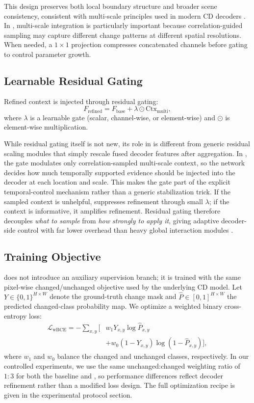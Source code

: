 This design preserves both local boundary structure and broader scene consistency, consistent with multi-scale principles used in modern CD decoders \cite{yan2024,shanshan2024,binhao2025}. In \cosa{}, multi-scale integration is particularly important because correlation-guided sampling may capture different change patterns at different spatial resolutions. When needed, a $1\times1$ projection compresses concatenated channels before gating to control parameter growth.

\subsection{Learnable Residual Gating}
Refined context is injected through residual gating:
\begin{equation}
F_{\text{refined}} = F_{\text{base}} + \lambda \odot \mathrm{Ctx}_{\text{multi}},
\end{equation}
where $\lambda$ is a learnable gate (scalar, channel-wise, or element-wise) and $\odot$ is element-wise multiplication.

While residual gating itself is not new, its role in \cosa{} is different from generic residual scaling modules that simply rescale fused decoder features after aggregation. In \cosa{}, the gate modulates only correlation-sampled multi-scale context, so the network decides how much temporally supported evidence should be injected into the decoder at each location and scale. This makes the gate part of the explicit temporal-control mechanism rather than a generic stabilization trick. If the sampled context is unhelpful, \cosa{} suppresses refinement through small $\lambda$; if the context is informative, it amplifies refinement. Residual gating therefore decouples \emph{what to sample} from \emph{how strongly to apply it}, giving \cosa{} adaptive decoder-side control with far lower overhead than heavy global interaction modules \cite{w2022,wei2024,xiaowen2024}.

\subsection{Training Objective}
\cosa{} does not introduce an auxiliary supervision branch; it is trained with the same pixel-wise changed/unchanged objective used by the underlying CD model. Let $Y \in \{0,1\}^{H \times W}$ denote the ground-truth change mask and $\hat{P} \in [0,1]^{H \times W}$ the predicted changed-class probability map. We optimize a weighted binary cross-entropy loss:
\begin{equation}
\begin{aligned}
\mathcal{L}_{\text{wBCE}} = - \sum_{x,y} \big[& w_1 Y_{x,y}\log \hat{P}_{x,y} \\
&+ w_0(1-Y_{x,y})\log(1-\hat{P}_{x,y})\big],
\end{aligned}
\end{equation}
where $w_1$ and $w_0$ balance the changed and unchanged classes, respectively. In our controlled experiments, we use the same unchanged:changed weighting ratio of $1:3$ for both the baseline and \cosa{}, so performance differences reflect decoder refinement rather than a modified loss design. The full optimization recipe is given in the experimental protocol section.

